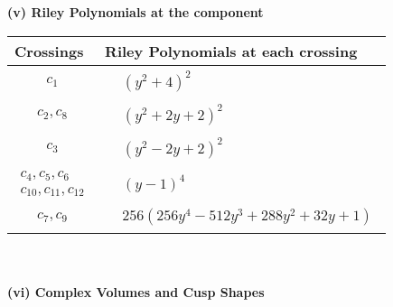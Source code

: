 \documentclass[1p]{elsarticle_modified}
\theoremstyle{definition}
\begin{document}
\newpage\renewcommand{\arraystretch}{1}
\flushleft \textbf{(v) Riley Polynomials at the component}\newline \\
\begin{tabular}{m{50pt}|m{274pt}}
Crossings & \hspace{64pt}Riley Polynomials at each crossing \\
\hline $$\begin{aligned}c_{1}\end{aligned}$$&$\begin{aligned}
&(y^2+4)^2
\end{aligned}$\\
\hline $$\begin{aligned}c_{2},c_{8}\end{aligned}$$&$\begin{aligned}
&(y^2+2 y+2)^2
\end{aligned}$\\
\hline $$\begin{aligned}c_{3}\end{aligned}$$&$\begin{aligned}
&(y^2-2 y+2)^2
\end{aligned}$\\
\hline $$\begin{aligned}c_{4},c_{5},c_{6}\\c_{10},c_{11},c_{12}\end{aligned}$$&$\begin{aligned}
&(y-1)^4
\end{aligned}$\\
\hline $$\begin{aligned}c_{7},c_{9}\end{aligned}$$&$\begin{aligned}
&256(256 y^4-512 y^3+288 y^2+32 y+1)
\end{aligned}$\\
\hline
\end{tabular}\\~\\
\newpage\flushleft \textbf{(vi) Complex Volumes and Cusp Shapes}
\end{document}

